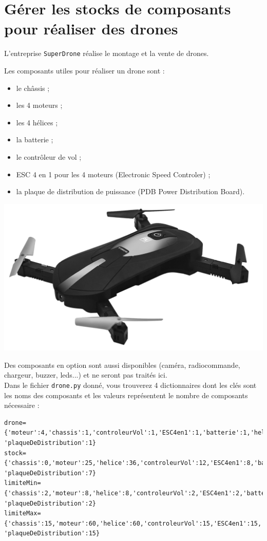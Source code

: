 

\section{Gérer les stocks de composants pour réaliser des drones}
L'entreprise \texttt{SuperDrone} réalise le montage et la vente de drones.\\

\begin{minipage}{.7\textwidth}%
Les composants utiles pour réaliser un drone sont :
\begin{itemize}
\item le châssis ;
\item les 4 moteurs ;
\item les 4 hélices ;
\item la batterie ;
\item le contrôleur de vol ;
\item ESC 4 en 1 pour les 4 moteurs (Electronic Speed Controler) ;
\item la plaque de distribution de puissance (PDB Power Distribution Board).
\end{itemize}
\end{minipage}%
\hfill
\begin{minipage}{.3\textwidth}%
\includegraphics[width=\textwidth]{drone.jpg}
\end{minipage}
Des composants en option sont aussi disponibles (caméra, radiocommande, chargeur, buzzer, leds...) et ne seront pas traités ici.\\

Dans le fichier \texttt{drone.py} donné, vous trouverez 4 dictionnaires dont les clés sont les noms des composants et les valeurs représentent le nombre de composants nécessaire :

\begin{lstlisting}
drone={'moteur':4,'chassis':1,'controleurVol':1,'ESC4en1':1,'batterie':1,'helice':4,
'plaqueDeDistribution':1}
stock={'chassis':0,'moteur':25,'helice':36,'controleurVol':12,'ESC4en1':8,'batterie':20,
'plaqueDeDistribution':7}
limiteMin={'chassis':2,'moteur':8,'helice':8,'controleurVol':2,'ESC4en1':2,'batterie':2,
'plaqueDeDistribution':2}
limiteMax={'chassis':15,'moteur':60,'helice':60,'controleurVol':15,'ESC4en1':15,'batterie':30,
'plaqueDeDistribution':15}
\end{lstlisting}

